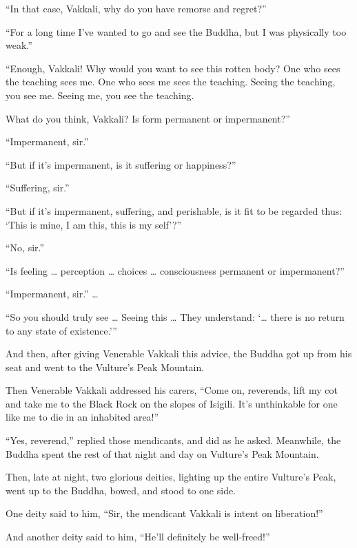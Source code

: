 \documentclass[12pt,openany]{book}%
\begin{document}
“In that case, Vakkali, why do you have remorse and regret?” 

“For a long time I’ve wanted to go and see the Buddha, but I was physically too weak.” 

“Enough, Vakkali! Why would you want to see this rotten body? One who sees the teaching sees me. One who sees me sees the teaching. Seeing the teaching, you see me. Seeing me, you see the teaching. 

What do you think, Vakkali? Is form permanent or impermanent?” 

“Impermanent, sir.” 

“But if it’s impermanent, is it suffering or happiness?” 

“Suffering, sir.” 

“But if it’s impermanent, suffering, and perishable, is it fit to be regarded thus: ‘This is mine, I am this, this is my self’?” 

“No, sir.” 

“Is feeling … perception … choices … consciousness permanent or impermanent?” 

“Impermanent, sir.” … 

“So you should truly see … Seeing this … They understand: ‘… there is no return to any state of existence.’” 

And then, after giving Venerable Vakkali this advice, the Buddha got up from his seat and went to the Vulture’s Peak Mountain. 

Then Venerable Vakkali addressed his carers, “Come on, reverends, lift my cot and take me to the Black Rock on the slopes of Isigili. It’s unthinkable for one like me to die in an inhabited area!” 

“Yes, reverend,” replied those mendicants, and did as he asked. Meanwhile, the Buddha spent the rest of that night and day on Vulture’s Peak Mountain. 

Then, late at night, two glorious deities, lighting up the entire Vulture’s Peak, went up to the Buddha, bowed, and stood to one side. 

One deity said to him, “Sir, the mendicant Vakkali is intent on liberation!” 

And another deity said to him, “He’ll definitely be well-freed!” 
\end{document}
